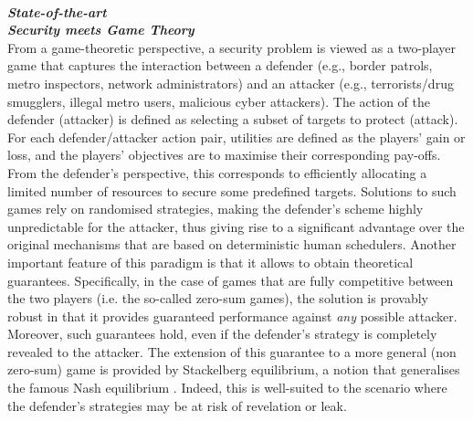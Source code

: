  

 

\noindent \textbf{\textit{\\State-of-the-art}}
\noindent \textbf{\textit{\\Security meets Game Theory }}\\
From a game-theoretic perspective, a security problem is viewed as a two-player game that captures the interaction between a defender (e.g., border patrols, metro inspectors, network administrators) and an attacker (e.g., terrorists/drug smugglers, illegal metro users, malicious cyber attackers). The action of the defender (attacker) is defined as selecting a subset of targets to protect (attack). For each defender/attacker action pair, utilities are defined as the players' gain or loss, and the players' objectives are to maximise their corresponding pay-offs. From the defender's perspective, this corresponds to efficiently allocating a limited number of resources to secure some predefined targets. 
Solutions to such games rely on randomised strategies, making the defender's scheme highly unpredictable for the attacker, thus giving rise to a significant advantage over the original mechanisms that are based on deterministic human schedulers. Another important feature of this paradigm is that it allows to obtain theoretical guarantees. Specifically, in the case of games that are fully competitive between the two players  (i.e. the so-called zero-sum games), the solution is provably robust in that it provides guaranteed performance against {\em any} possible attacker. Moreover, such guarantees hold, even if the defender's strategy is completely revealed to the attacker.  
The extension of this guarantee to a more general (non zero-sum) game is provided by Stackelberg equilibrium, a notion that generalises the famous Nash equilibrium \cite{korzhyk2011stackelberg}. Indeed, this is well-suited to the scenario where the defender's strategies may be at risk of revelation or leak. 

